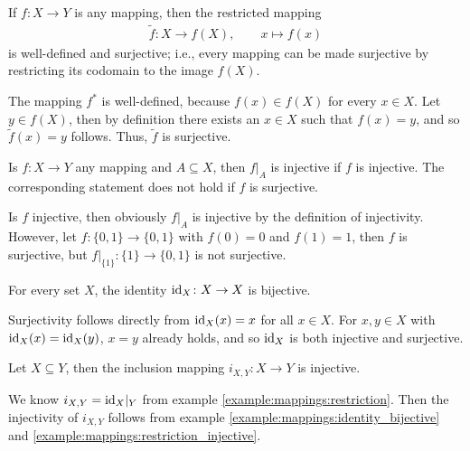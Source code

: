 \begin{examples}
    \begin{exampleenumerate}
        \item\label{example:mappings:every_map_surjective} If $f\colon X\rightarrow Y$ is any mapping, then the restricted mapping \begin{align}\tilde f\colon X\rightarrow f(X),\qquad x\mapsto f(x)\end{align} is well-defined and surjective; i.e., every mapping can be made surjective by restricting its codomain to the image $f(X)$.
        \begin{miniproof}
        The mapping $f^*$ is well-defined, because $f(x)\in f(X)$ for every $x\in X$. Let $y\in f(X)$, then by definition there exists an $x\in X$ such that $f(x)=y$, and so $\tilde f(x)=y$ follows. Thus, $\tilde f$ is surjective.
        \end{miniproof}
        \item\label{example:mappings:restriction_injective} Is $f\colon X\rightarrow Y$ any mapping and $A\subseteq X$, then $f\vert_A$ is injective if $f$ is injective. The corresponding statement does not hold if $f$ is surjective.
        \begin{miniproof}
            Is $f$ injective, then obviously $f\vert_A$ is injective by the definition of injectivity. However, let $f\colon \{0,1\}\rightarrow \{0,1\}$ with $f(0)=0$ and $f(1)=1$, then $f$ is surjective, but $f\vert_{\{1\}}\colon \{1\}\rightarrow \{0,1\}$ is not surjective.
        \end{miniproof}
        \item\label{example:mappings:identity_bijective} For every set $X$, the identity $\text{id}_X\colon X\rightarrow X$ is bijective.
        \begin{miniproof}
            Surjectivity follows directly from $\text{id}_X(x)=x$ for all $x\in X$. For $x,y\in X$ with $\text{id}_X(x)=\text{id}_X(y)$, $x=y$ already holds, and so $\text{id}_X$ is both injective and surjective.
        \end{miniproof}
        \item\label{example:mappings:inclusion_mapping_injective} Let $X\subseteq Y$, then the inclusion mapping $i_{X,Y}\colon X\rightarrow Y$ is injective.
        \begin{miniproof}
            We know $i_{X,Y}=\text{id}_X\vert_Y$ from example \ref{example:mappings:restriction}. Then the injectivity of $i_{X,Y}$ follows from example \ref{example:mappings:identity_bijective} and \ref{example:mappings:restriction_injective}.

\end{miniproof}
\end{exampleenumerate}
\end{examples}
